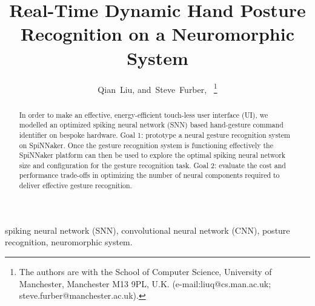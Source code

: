 \documentclass[journal]{journal}
\begin{document}
\title{Real-Time Dynamic Hand Posture Recognition on a Neuromorphic System}
\author{
Qian~Liu, 
and~Steve~Furber,~
\thanks{
The authors are with the School of Computer Science, University of Manchester, Manchester M13 9PL, U.K. 
(e-mail:liuq@cs.man.ac.uk; steve.furber@manchester.ac.uk).}
}%

\maketitle
\thispagestyle{empty}

\begin{abstract}
In order to make an effective, energy-efficient touch-less user interface (UI), we modelled an optimized spiking neural network (SNN) based hand-gesture command identifier on bespoke hardware. 
Goal 1:  prototype a neural gesture recognition system on SpiNNaker. 
Once the gesture recognition system is functioning effectively the SpiNNaker platform can then be used to explore the optimal spiking neural network size and configuration for the gesture recognition task.
Goal 2:  evaluate the cost and performance trade-offs in optimizing the number of neural components required to deliver effective gesture recognition.
\end{abstract}

\begin{IEEEkeywords}
spiking neural network (SNN), convolutional neural network (CNN), posture recognition, neuromorphic system.
\end{IEEEkeywords}
\end{document}
